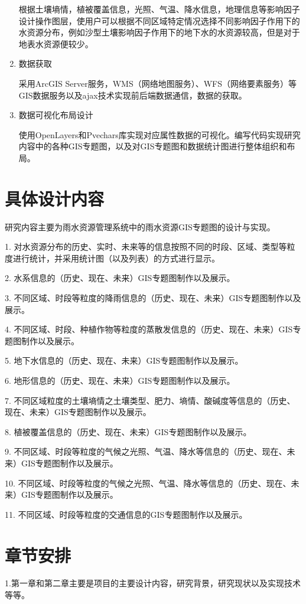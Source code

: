 \begin{enumerate}
根据土壤墒情，植被覆盖信息，光照、气温、降水信息，地理信息等影响因子设计操作图层，使用户可以根据不同区域特定情况选择不同影响因子作用下的水资源分布，例如沙型土壤影响因子作用下的地下水的水资源较高，但是对于地表水资源便较少。

\item 	数据获取

采用ArcGIS Server服务，WMS（网络地图服务）、WFS（网络要素服务）等GIS数据服务以及ajax技术实现前后端数据通信，数据的获取。
\item 	数据可视化布局设计

使用OpenLayers和Pvechars库实现对应属性数据的可视化。编写代码实现研究内容中的各种GIS专题图，以及对GIS专题图和数据统计图进行整体组织和布局。
\end{enumerate}
\section{具体设计内容}

研究内容主要为雨水资源管理系统中的雨水资源GIS专题图的设计与实现。


1.	对水资源分布的历史、实时、未来等的信息按照不同的时段、区域、类型等粒度进行统计，并采用统计图（以及列表）的方式进行显示。


2.	水系信息的（历史、现在、未来）GIS专题图制作以及展示。

3.	不同区域、时段等粒度的降雨信息的（历史、现在、未来）GIS专题图制作以及展示。


4.	不同区域、时段、种植作物等粒度的蒸散发信息的（历史、现在、未来）GIS专题图制作以及展示。


5.	地下水信息的（历史、现在、未来）GIS专题图制作以及展示。


6.	地形信息的（历史、现在、未来）GIS专题图制作以及展示。

7.	不同区域粒度的土壤墒情之土壤类型、肥力、墒情、酸碱度等信息的（历史、现在、未来）GIS专题图制作以及展示。

8.	植被覆盖信息的（历史、现在、未来）GIS专题图制作以及展示。

9.	不同区域、时段等粒度的气候之光照、气温、降水等信息的（历史、现在、未来）GIS专题图制作以及展示。

10.	不同区域、时段等粒度的气候之光照、气温、降水等信息的（历史、现在、未来）GIS专题图制作以及展示。

11.	不同区域、时段等粒度的交通信息的GIS专题图制作以及展示。



\section{章节安排}
1.第一章和第二章主要是项目的主要设计内容，研究背景，研究现状以及实现技术等等。


